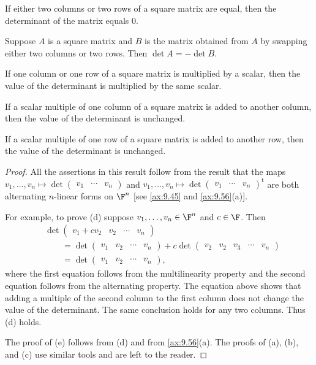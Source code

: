 \begin{result}\label{ax:9.57}\leavevmode
\begin{parts}
\item If either two columns or two rows of a square matrix are equal, then the
  determinant of the matrix equals $0$.
\item Suppose $A$ is a square matrix and $B$ is the matrix obtained from $A$ by
  swapping either two columns or two rows. Then $\det A=-\det B$.
\item If one column or one row of a square matrix is multiplied by a scalar,
  then the value of the determinant is multiplied by the same scalar.
\item If a scalar multiple of one column of a square matrix is added to another
  column, then the value of the determinant is unchanged.
\item If a scalar multiple of one row of a square matrix is added to another
  row, then the value of the determinant is unchanged.
\end{parts}
\end{result}

\begin{proof}
All the assertions in this result follow from the result that the maps
$v_1,\dots,v_n\mapsto\det\begin{pmatrix} v_1 & \cdots & v_n \end{pmatrix}$ and
$v_1,\dots,v_n\mapsto
\det\begin{pmatrix} v_1 & \cdots & v_n \end{pmatrix}^{\mathrm{t}}$ are both
alternating $n$-linear forms on $\F^n$ [see \ref{ax:9.45} and
\ref{ax:9.56}(a)].

For example, to prove (d) suppose $v_1,\dots,v_n\in\F^n$ and $c\in\F$. Then
\begin{align*}
&\det\begin{pmatrix} v_1+cv_2 & v_2 & \cdots & v_n \end{pmatrix}\\
&\qquad= \det\begin{pmatrix} v_1 & v_2 & \cdots & v_n \end{pmatrix}
  + c\det\begin{pmatrix} v_2 & v_2 & v_3 & \cdots & v_n \end{pmatrix}\\
&\qquad= \det\begin{pmatrix} v_1 & v_2 & \cdots & v_n \end{pmatrix},
\end{align*}
where the first equation follows from the multilinearity property and the
second equation follows from the alternating property. The equation above
shows that adding a multiple of the second column to the first column does not
change the value of the determinant. The same conclusion holds for any two
columns. Thus (d) holds.

The proof of (e) follows from (d) and from \ref{ax:9.56}(a). The proofs of (a),
(b), and (c) use similar tools and are left to the reader.
\end{proof}

